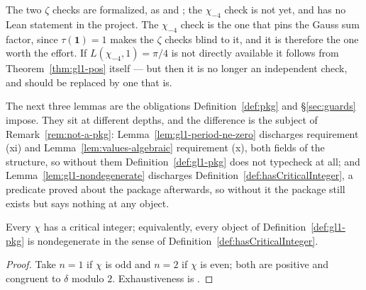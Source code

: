\begin{remark}
  \label{rem:numeric-status}
  The two $\zeta$ checks are formalized, as
   and
  ; the $\chi_{-4}$ check is not yet, and has no
  Lean statement in the project. The $\chi_{-4}$ check is the one
  that pins the Gauss sum factor, since $\tau(\mathbf{1}) = 1$ makes the $\zeta$
  checks blind to it, and it is therefore the one worth the effort. If
  $L(\chi_{-4},1) = \pi/4$ is not directly available it follows from
  Theorem~\ref{thm:gl1-pos} itself --- but then it is no longer an independent check,
  and should be replaced by one that is.
\end{remark}

The next three lemmas are the obligations Definition~\ref{def:pkg} and \S\ref{sec:guards}
impose. They sit at different depths, and the difference is the subject of
Remark~\ref{rem:not-a-pkg}: Lemma~\ref{lem:gl1-period-ne-zero} discharges requirement (xi)
and Lemma~\ref{lem:values-algebraic} requirement (x), both fields of the structure, so without
them Definition~\ref{def:gl1-pkg} does not typecheck at all; and
Lemma~\ref{lem:gl1-nondegenerate} discharges
Definition~\ref{def:hasCriticalInteger}, a predicate proved about the package afterwards, so
without it the package still exists but says nothing at any object.

\begin{lemma}
  \label{lem:gl1-nondegenerate}
  \leanok
  Every $\chi$ has a critical integer; equivalently, every object of
  Definition~\ref{def:gl1-pkg} is nondegenerate in the sense of
  Definition~\ref{def:hasCriticalInteger}.
\end{lemma}
\begin{proof}
  \leanok
  Take $n = 1$ if $\chi$ is odd and $n = 2$ if $\chi$ is even; both are positive and
  congruent to $\delta$ modulo $2$. Exhaustiveness is
  .
\end{proof}

